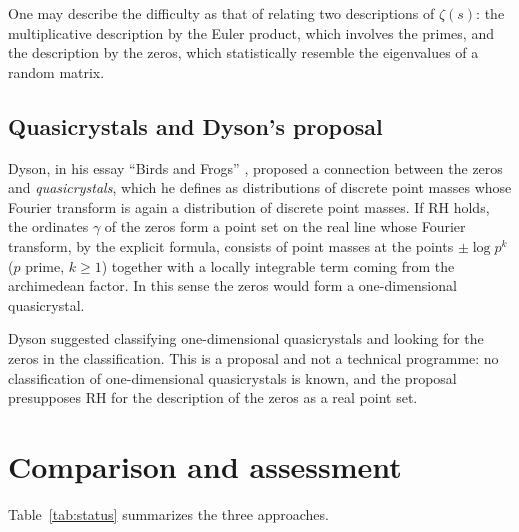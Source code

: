 \documentclass[11pt]{amsart}
\theoremstyle{definition}
\theoremstyle{remark}
\begin{document}
One may describe the difficulty as that of relating two descriptions of $\zeta(s)$: the multiplicative description by the Euler product, which involves the primes, and the description by the zeros, which statistically resemble the eigenvalues of a random matrix.

\subsection{Quasicrystals and Dyson's proposal}\label{sec:quasi}

Dyson, in his essay ``Birds and Frogs'' \cite{dyson2009}, proposed a connection between the zeros and \emph{quasicrystals}, which he defines as distributions of discrete point masses whose Fourier transform is again a distribution of discrete point masses. If RH holds, the ordinates $\gamma$ of the zeros form a point set on the real line whose Fourier transform, by the explicit formula, consists of point masses at the points $\pm\log p^k$ ($p$ prime, $k \ge 1$) together with a locally integrable term coming from the archimedean factor. In this sense the zeros would form a one-dimensional quasicrystal.

Dyson suggested classifying one-dimensional quasicrystals and looking for the zeros in the classification. This is a proposal and not a technical programme: no classification of one-dimensional quasicrystals is known, and the proposal presupposes RH for the description of the zeros as a real point set.

\section{Comparison and assessment}\label{sec:synthesis}

Table~\ref{tab:status} summarizes the three approaches.
\end{document}
